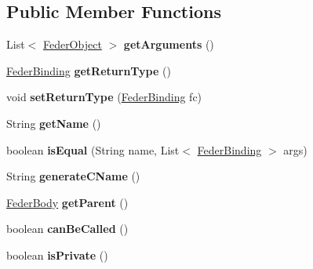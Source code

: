 \subsection*{Public Member Functions}
\begin{DoxyCompactItemize}
\item 
\mbox{\label{interfacefeder_1_1types_1_1FederArguments_ab52a621d8a4ac4e5c6c618db36732cc6}} 
List$<$ \hyperlink{classfeder_1_1types_1_1FederObject}{Feder\+Object} $>$ {\bfseries get\+Arguments} ()
\item 
\mbox{\label{interfacefeder_1_1types_1_1FederArguments_a9c26ec99b5be474f308456b536a81b2d}} 
\hyperlink{classfeder_1_1types_1_1FederBinding}{Feder\+Binding} {\bfseries get\+Return\+Type} ()
\item 
\mbox{\label{interfacefeder_1_1types_1_1FederArguments_a528e2baac5fa801623d2d57eadd9f620}} 
void {\bfseries set\+Return\+Type} (\hyperlink{classfeder_1_1types_1_1FederBinding}{Feder\+Binding} fc)
\item 
\mbox{\label{interfacefeder_1_1types_1_1FederArguments_af6c7334cd40b2493ab5c22da624f6024}} 
String {\bfseries get\+Name} ()
\item 
\mbox{\label{interfacefeder_1_1types_1_1FederArguments_a8d9c851eaef82f27a871d57b77311a20}} 
boolean {\bfseries is\+Equal} (String name, List$<$ \hyperlink{classfeder_1_1types_1_1FederBinding}{Feder\+Binding} $>$ args)
\item 
\mbox{\label{interfacefeder_1_1types_1_1FederArguments_aff985816edbc33831f9ecf941f9f5667}} 
String {\bfseries generate\+C\+Name} ()
\item 
\mbox{\label{interfacefeder_1_1types_1_1FederArguments_a558b054cc277f7b8795b7651a1c57d7d}} 
\hyperlink{classfeder_1_1types_1_1FederBody}{Feder\+Body} {\bfseries get\+Parent} ()
\item 
\mbox{\label{interfacefeder_1_1types_1_1FederArguments_ac3501e9f7b11a9ab902f865e6a9dd938}} 
boolean {\bfseries can\+Be\+Called} ()
\item 
\mbox{\label{interfacefeder_1_1types_1_1FederArguments_a04044c9dab7c97b96f840e8c73f459d7}} 
boolean {\bfseries is\+Private} ()
\end{DoxyCompactItemize}


